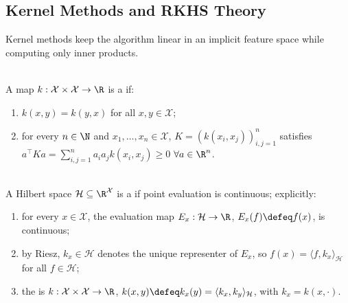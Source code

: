 \subsection{Kernel Methods and RKHS Theory}

Kernel methods keep the algorithm linear in an implicit feature space while computing only inner products.

\begin{definition} \label{def:sl-positive-definite-kernel} \\
A map $k:\mathcal{X}\times\mathcal{X}\to\R$ is a  if:
\begin{enumerate}[label=(\roman*)]
\setlength{\itemsep}{0pt}
\item $k(x,y)=k(y,x)$ for all $x,y\in\mathcal{X}$;
\item for every $n\in\N$ and $x_1,\ldots,x_n\in\mathcal{X}$, $K=(k(x_i,x_j))_{i,j=1}^n$ satisfies $a^\top K a=\sum\limits_{i,j=1}^n a_i a_j k(x_i,x_j)\geq0$ $\forall a\in\R^n$.
\end{enumerate}
\end{definition}

\begin{definition} \label{def:sl-rkhs} \\
A Hilbert space $\mathcal{H}\subseteq\R^{\mathcal{X}}$ is a  if point evaluation is continuous; explicitly:
\begin{enumerate}[label=(\roman*)]
\setlength{\itemsep}{0pt}
\item for every $x\in\mathcal{X}$, the evaluation map $E_x:\mathcal{H}\to\R$, $E_x(f)\defeq f(x)$, is continuous;
\item by Riesz, $k_x\in\mathcal{H}$ denotes the unique representer of $E_x$, so $f(x)=\langle f,k_x\rangle_{\mathcal{H}}$ for all $f\in\mathcal{H}$;
\item the  is $k:\mathcal{X}\times\mathcal{X}\to\R$, $k(x,y)\defeq k_x(y)=\langle k_x,k_y\rangle_{\mathcal{H}}$, with $k_x=k(x,\cdot)$.
\end{enumerate}
\end{definition}


